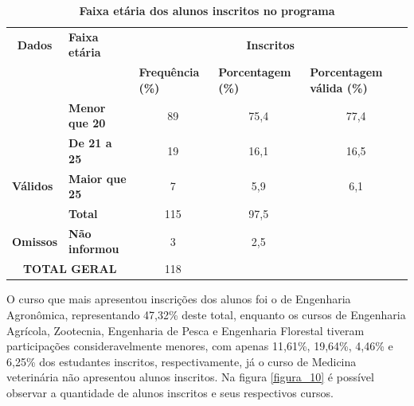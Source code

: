 \begin{table}[!htb]
\caption{\textbf{Faixa etária dos alunos inscritos no programa}}
\label{tab:tabela_4}
\begin{tabular}{clccc}
\hline \hline
{\color[HTML]{000000} \textbf{Dados}} & {\color[HTML]{000000} \textbf{Faixa etária}} & \multicolumn{3}{c}{{\color[HTML]{000000} \textbf{Inscritos}}} \\ \cline{1-5}
{\color[HTML]{000000} } & {\color[HTML]{000000} } & \multicolumn{1}{l}{{\color[HTML]{000000} \textbf{Frequência (\%)}}} & \multicolumn{1}{l}{{\color[HTML]{000000} \textbf{Porcentagem (\%)}}} & \multicolumn{1}{l}{{\color[HTML]{000000} \textbf{Porcentagem válida (\%)}}} \\
{\color[HTML]{000000} } & {\color[HTML]{000000} \textbf{Menor que 20}} & {\color[HTML]{000000} 89} & {\color[HTML]{000000} 75,4} & {\color[HTML]{000000} 77,4}\\[8pt]
\multirow{-3}{*}{{\color[HTML]{000000} \textbf{}}} & {\color[HTML]{000000} \textbf{De 21 a 25}} & {\color[HTML]{000000} 19} & {\color[HTML]{000000} 16,1} & {\color[HTML]{000000} 16,5} \\[8pt]
\multicolumn{1}{l}{{\color[HTML]{000000} \textbf{Válidos}}} & {\color[HTML]{000000} \textbf{Maior que 25}} & {\color[HTML]{000000} 7} & {\color[HTML]{000000} 5,9} & {\color[HTML]{000000} 6,1}\\[8pt]
\multicolumn{1}{l}{{\color[HTML]{000000} \textbf{}}} & {\color[HTML]{000000} \textbf{Total}} & {\color[HTML]{000000} 115} & {\color[HTML]{000000} 97,5} & {\color[HTML]{000000} } \\[8pt]\hline
\multicolumn{1}{l}{{\color[HTML]{000000} \textbf{Omissos}}} & {\color[HTML]{000000} \textbf{Não informou}} & {\color[HTML]{000000} 3} & {\color[HTML]{000000} 2,5} & {\color[HTML]{000000} } \\[8pt] \hline
\multicolumn{2}{c}{{\color[HTML]{000000} \textbf{TOTAL GERAL}}} & {\color[HTML]{000000} 118} & {\color[HTML]{000000} } & {\color[HTML]{000000} } \\ \hline\hline
\end{tabular}
\end{table}

O curso que mais apresentou inscrições dos alunos foi o de Engenharia Agronômica, representando 47,32\% deste total, enquanto os cursos de Engenharia Agrícola, Zootecnia, Engenharia de Pesca e Engenharia Florestal tiveram participações consideravelmente menores, com apenas 11,61\%, 19,64\%, 4,46\% e 6,25\% dos estudantes inscritos, respectivamente, já o curso de Medicina veterinária não apresentou alunos inscritos. Na figura  \ref{figura_10} é possível observar a quantidade de alunos inscritos e seus respectivos cursos.

